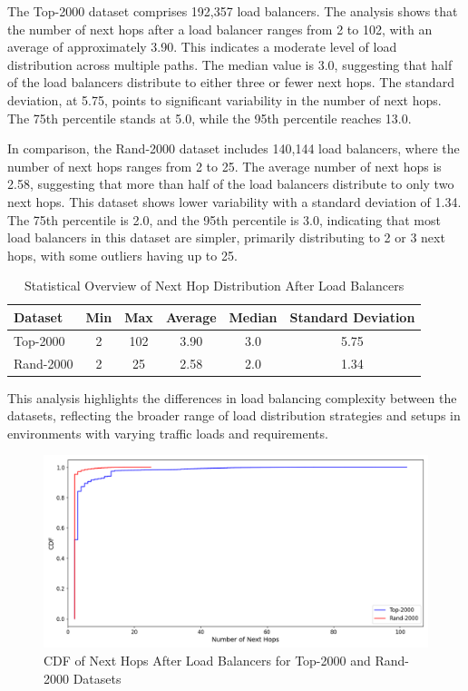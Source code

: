 \documentclass[12pt]{cwru_thesis}
\begin{document}
The Top-2000 dataset comprises 192,357 load balancers. The analysis shows that the number of next hops after a load balancer ranges from 2 to 102, with an average of approximately 3.90. This indicates a moderate level of load distribution across multiple paths. The median value is 3.0, suggesting that half of the load balancers distribute to either three or fewer next hops. The standard deviation, at 5.75, points to significant variability in the number of next hops. The 75th percentile stands at 5.0, while the 95th percentile reaches 13.0.

In comparison, the Rand-2000 dataset includes 140,144 load balancers, where the number of next hops ranges from 2 to 25. The average number of next hops is 2.58, suggesting that more than half of the load balancers distribute to only two next hops. This dataset shows lower variability with a standard deviation of 1.34. The 75th percentile is 2.0, and the 95th percentile is 3.0, indicating that most load balancers in this dataset are simpler, primarily distributing to 2 or 3 next hops, with some outliers having up to 25.

\begin{table}[h]
\centering
\begin{tabular}{|l|c|c|c|c|c|}
\hline
\textbf{Dataset} & \textbf{Min} & \textbf{Max} & \textbf{Average} & \textbf{Median} & \textbf{Standard Deviation} \\
\hline
Top-2000 & 2 & 102 & 3.90 & 3.0 & 5.75 \\
Rand-2000 & 2 & 25 & 2.58 & 2.0 & 1.34 \\
\hline
\end{tabular}
\caption{Statistical Overview of Next Hop Distribution After Load Balancers}
\label{tab:next_hop_stats}
\end{table}

This analysis highlights the differences in load balancing complexity between the datasets, reflecting the broader range of load distribution strategies and setups in environments with varying traffic loads and requirements.

\begin{figure}[h]
    \centering
    \includegraphics[width=\linewidth]{figures/cdf_next_hops.png}
    \caption{CDF of Next Hops After Load Balancers for Top-2000 and Rand-2000 Datasets}
    \label{fig:cdf_next_hops}
\end{figure}
\end{document}

